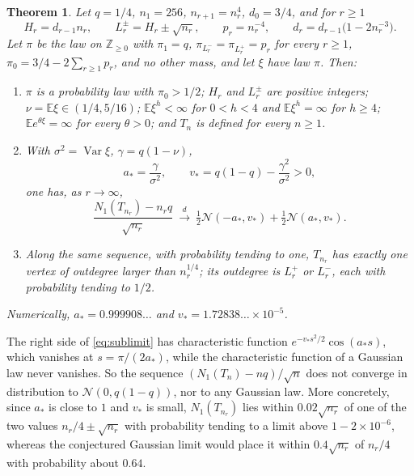 \documentclass[11pt]{amsart}
\newtheorem{theorem}{Theorem}[section]
\theoremstyle{definition}
\newcommand{\Z}{\mathbb{Z}}
\newcommand{\E}{\mathbb{E}}
\newcommand{\Nor}{\mathcal{N}}
\DeclareMathOperator{\Var}{Var}
\begin{document}
\begin{theorem}\label{thm:sub}
Let $q=1/4$, $n_1=256$, $n_{r+1}=n_r^4$, $d_0=3/4$, and for $r\ge1$
\begin{equation}\label{eq:law}
H_r=d_{r-1}n_r,\qquad L_r^{\pm}=H_r\pm\sqrt{n_r},\qquad p_r=n_r^{-4},\qquad d_r=d_{r-1}\big(1-2n_r^{-3}\big).
\end{equation}
Let $\pi$ be the law on $\Z_{\ge0}$ with $\pi_1=q$, $\pi_{L_r^-}=\pi_{L_r^+}=p_r$ for every $r\ge1$, $\pi_0=3/4-2\sum_{r\ge1}p_r$, and no other mass, and let $\xi$ have law $\pi$. Then:
\begin{enumerate}
\item[(i)] $\pi$ is a probability law with $\pi_0>1/2$; $H_r$ and $L_r^\pm$ are positive integers; $\nu=\E\xi\in(1/4,5/16)$; $\E\xi^h<\infty$ for $0<h<4$ and $\E\xi^h=\infty$ for $h\ge4$; $\E e^{\theta\xi}=\infty$ for every $\theta>0$; and $T_n$ is defined for every $n\ge1$.
\item[(ii)] With $\sigma^2=\Var\xi$, $\gamma=q(1-\nu)$,
\begin{equation}\label{eq:consts}
a_*=\frac{\gamma}{\sigma^2},\qquad v_*=q(1-q)-\frac{\gamma^2}{\sigma^2}>0,
\end{equation}
one has, as $r\to\infty$,
\begin{equation}\label{eq:sublimit}
\frac{N_1(T_{n_r})-n_rq}{\sqrt{n_r}}\ \xrightarrow{d}\ \tfrac12\Nor(-a_*,v_*)+\tfrac12\Nor(a_*,v_*).
\end{equation}
\item[(iii)] Along the same sequence, with probability tending to one, $T_{n_r}$ has exactly one vertex of outdegree larger than $n_r^{1/4}$; its outdegree is $L_r^+$ or $L_r^-$, each with probability tending to $1/2$.
\end{enumerate}
Numerically, $a_*=0.999908\ldots$ and $v_*=1.72838\ldots\times10^{-5}$.
\end{theorem}

The right side of \eqref{eq:sublimit} has characteristic function $e^{-v_*s^2/2}\cos(a_*s)$, which vanishes at $s=\pi/(2a_*)$, while the characteristic function of a Gaussian law never vanishes. So the sequence $(N_1(T_n)-nq)/\sqrt n$ does not converge in distribution to $\Nor(0,q(1-q))$, nor to any Gaussian law. More concretely, since $a_*$ is close to $1$ and $v_*$ is small, $N_1(T_{n_r})$ lies within $0.02\sqrt{n_r}$ of one of the two values $n_r/4\pm\sqrt{n_r}$ with probability tending to a limit above $1-2\times10^{-6}$, whereas the conjectured Gaussian limit would place it within $0.4\sqrt{n_r}$ of $n_r/4$ with probability about $0.64$.
\end{document}
